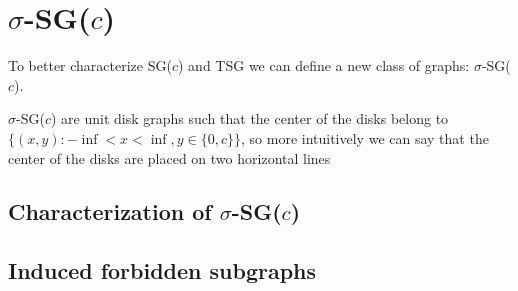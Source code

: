 \chapter{$\sigma$-SG($c$)}

To better characterize SG($c$) and TSG we can define a new class of graphs: $\sigma$-SG($c$).

$\sigma$-SG($c$) are unit disk graphs such that the center of the disks belong to $\{(x,y): -\inf < x < \inf, y \in \{0,c\}\}$, so more intuitively we can say that the center of the disks are placed on two horizontal lines

\section{Characterization of $\sigma$-SG($c$)}



\section{Induced forbidden subgraphs}


